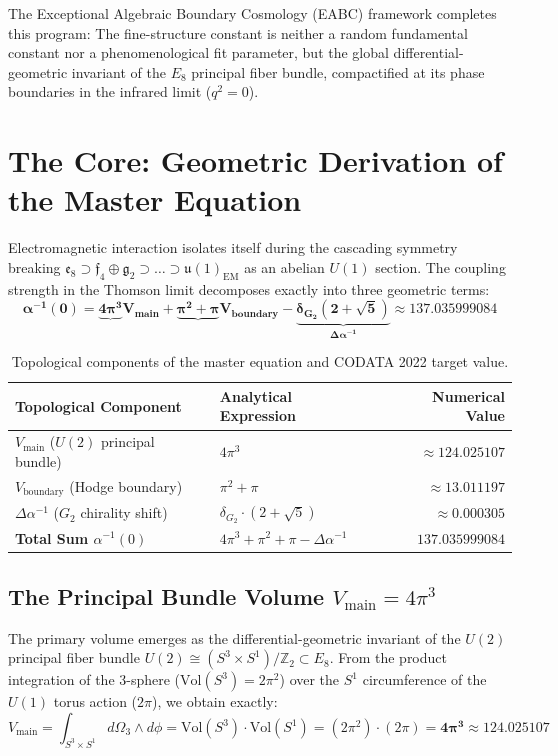 \documentclass[11pt,a4paper]{article}
\begin{document}
The Exceptional Algebraic Boundary Cosmology (EABC) framework completes this program: The fine-structure constant is neither a random fundamental constant nor a phenomenological fit parameter, but the global differential-geometric invariant of the $E_8$ principal fiber bundle, compactified at its phase boundaries in the infrared limit ($q^2 = 0$).

\section{The Core: Geometric Derivation of the Master Equation}
Electromagnetic interaction isolates itself during the cascading symmetry breaking $\mathfrak{e}_8 \supset \mathfrak{f}_4 \oplus \mathfrak{g}_2 \supset \dots \supset \mathfrak{u}(1)_{\text{EM}}$ as an abelian $U(1)$ section. The coupling strength in the Thomson limit decomposes exactly into three geometric terms:
\begin{equation}
\mathbf{\alpha^{-1}(0) = \underbrace{4\pi^3}{V_{\text{main}}} + \underbrace{\pi^2 + \pi}{V_{\text{boundary}}} - \underbrace{\delta_{G_2}(2 + \sqrt{5})}_{\Delta\alpha^{-1}} \approx 137.035999084}
\end{equation}

\begin{table}[h]
\centering
\begin{tabular}{llr}
\toprule
\textbf{Topological Component} & \textbf{Analytical Expression} & \textbf{Numerical Value} \\
\midrule
$V_{\text{main}}$ ($U(2)$ principal bundle) & $4\pi^3$ & $\approx 124.025107$ \\
$V_{\text{boundary}}$ (Hodge boundary) & $\pi^2 + \pi$ & $\approx 13.011197$ \\
$\Delta\alpha^{-1}$ ($G_2$ chirality shift) & $\delta_{G_2} \cdot (2 + \sqrt{5})$ & $\approx 0.000305$ \\
\midrule
\textbf{Total Sum $\alpha^{-1}(0)$} & $4\pi^3 + \pi^2 + \pi - \Delta\alpha^{-1}$ & $\mathbf{137.035999084}$ \\
\bottomrule
\end{tabular}
\caption{Topological components of the master equation and CODATA 2022 target value.}
\end{table}

\subsection{The Principal Bundle Volume $V_{\text{main}} = 4\pi^3$}
The primary volume emerges as the differential-geometric invariant of the $U(2)$ principal fiber bundle $U(2) \cong (S^3 \times S^1)/\mathbb{Z}_2 \subset E_8$. From the product integration of the 3-sphere ($\text{Vol}(S^3) = 2\pi^2$) over the $S^1$ circumference of the $U(1)$ torus action ($2\pi$), we obtain exactly:
\begin{equation}
V_{\text{main}} = \int_{S^3 \times S^1} d\Omega_3 \wedge d\phi = \text{Vol}(S^3) \cdot \text{Vol}(S^1) = (2\pi^2) \cdot (2\pi) = \mathbf{4\pi^3 \approx 124.025107}
\end{equation}
\end{document}
